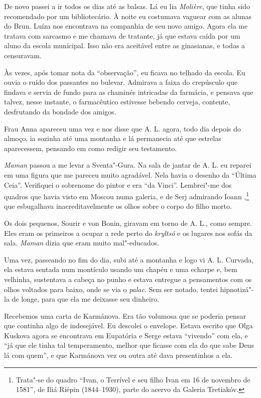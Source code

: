 De novo passei a ir todos os dias até as balsas. Lá eu lia
\emph{Molière}, que tinha sido recomendado por um bibliotecário. À noite
eu costumava vaguear com as alunas do Brun. Luíza nos encontrava na
companhia de seu novo amigo. Agora ela me tratava com sarcasmo e me
chamava de tratante, já que estava caída por um aluno da escola
municipal. Isso não era aceitável entre as ginasianas, e todas a
censuravam.

Às vezes, após tomar nota da ``observação'', eu ficava no telhado da
escola. Eu ouvia o ruído dos passantes no bulevar. Admirava a faixa do
crepúsculo que findava e servia de fundo para as chaminés intricadas da
farmácia, e pensava que talvez, nesse instante, o farmacêutico estivesse
bebendo cerveja, contente, desfrutando da bondade dos amigos.

Frau Anna apareceu uma vez e nos disse que A. L. agora, todo dia depois
do almoço, ia sozinha até uma montanha e lá permanecia até que estrelas
aparecessem, pensando em como redigir seu testamento.

\emph{Maman} passou a me levar a Sventa"-Gura. Na sala de jantar de A. L.
eu reparei em uma figura que me pareceu muito agradável. Nela havia o
desenho da ``Última Ceia''. Verifiquei o sobrenome do pintor e era ``da
Vinci''. Lembrei"-me dos quadros que havia visto em Moscou numa galeria,
e de Serj admirando Ioann \scalebox{.8}{IV},\footnote{Trata"-se do quadro ``Ivan, o
  Terrível e seu filho Ivan em 16 de novembro de 1581'', de Iliá Riépin
  (1844--1930), parte do acervo da Galeria Tretiakóv.} que esbugalhava
inacreditavelmente os olhos sobre o corpo do filho morto.

Os dois pequenos, Sourir e von Bonin, giravam em torno de A. L., como
sempre. Eles eram os primeiros a ocupar a rede perto do \emph{kryltsó} e
os lugares nos sofás da sala. \emph{Maman} dizia que eram muito
mal"-educados.

Uma vez, passeando no fim do dia, subi até a montanha e logo vi A. L.
Curvada, ela estava sentada num montículo usando um chapéu e uma echarpe
e, bem velhinha, sustentava a cabeça no punho e estava entregue a
pensamentos com os olhos voltados para baixo, onde se via o
\emph{palac}. Sem ser notado, tentei hipnotizá"-la de longe, para que ela
me deixasse seu dinheiro.

Recebemos uma carta de Karmánova. Era tão volumosa que se poderia pensar
que continha algo de indesejável. Eu descolei o envelope. Estava escrito
que Olga Kuskova agora se encontrava em Eupatória e Serge estava
``vivendo'' com ela, e ``já que ele tinha tal temperamento, melhor que
ficasse com ela do que sabe Deus lá com quem'', e que Karmánova vez ou
outra até dava presentinhos a ela.


